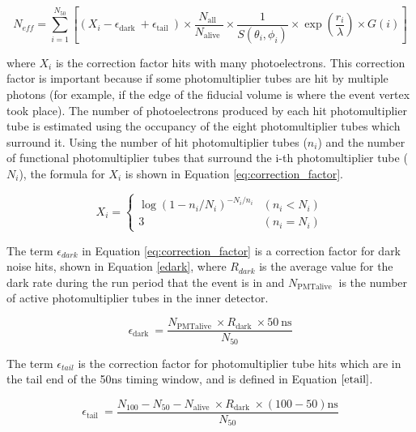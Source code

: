 \begin{equation}
    N_{e f f}=\sum_{i=1}^{N_{50}}\left[\left(X_{i}-\epsilon_{\text {dark }}+\epsilon_{\text {tail }}\right) \times \frac{N_{\text {all }}}{N_{\text {alive }}} \times \frac{1}{S\left(\theta_{i}, \phi_{i}\right)} \times \exp \left(\frac{r_{i}}{\lambda}\right) \times G(i)\right]
\label{eq:effectivePMTs}
\end{equation}

where $X_{i}$ is the correction factor hits with many photoelectrons. This correction factor is important because if some photomultiplier tubes are hit by multiple photons (for example, if the edge of the fiducial volume is where the event vertex took place). The number of photoelectrons produced by each hit photomultiplier tube is estimated using the occupancy of the eight photomultiplier tubes which surround it. Using the number of hit photomultiplier tubes ($n_{i}$) and the number of functional photomultiplier tubes that surround the i-th photomultiplier tube ($N_{i}$), the formula for $X_{i}$ is shown in Equation \ref{eq:correction_factor}.

\begin{equation}
    X_{i}=\left\{\begin{array}{ll}
    \log \left(1-n_{i} / N_{i}\right)^{-N_{i} / n_{i}} & \left(n_{i}<N_{i}\right) \\
    3 & \left(n_{i}=N_{i}\right)
    \end{array}\right.
    \label{eq:correction_factor}
\end{equation}


The term $\epsilon_{dark}$ in Equation \ref{eq:correction_factor} is a correction factor for dark noise hits, shown in Equation \ref{edark}, where $R_{dark}$ is the average value for the dark rate during the run period that the event is in and $N_{\text {PMT}\text {alive }}$ is the number of active photomultiplier tubes in the inner detector.


\begin{equation}
    \epsilon_{\text {dark }}=\frac{N_{\text {PMT}\text {alive }} \times R_{\text {dark }} \times 50 \mathrm{~ns}}{N_{50}}
    \label{edark}
\end{equation}

The term $\epsilon_{tail}$ is the correction factor for photomultiplier tube hits which are in the tail end of the 50ns timing window, and is defined in Equation $\ref{etail}$.

\begin{equation}
    \epsilon_{\text {tail }}=\frac{N_{100}-N_{50}-N_{\text {alive }} \times R_{\text {dark }} \times(100-50) \mathrm{ns}}{N_{50}}
    \label{etail}
\end{equation}


